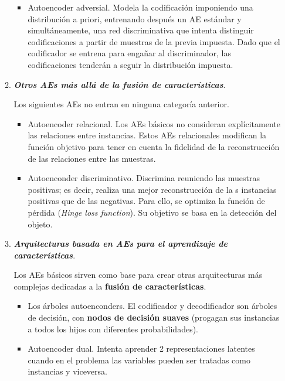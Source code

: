 \begin{enumerate}
\begin{enumerate}
\begin{itemize}
            \item Autoencoder adversial. Modela la codificación imponiendo una distribución a priori, entrenando después un AE estándar y simultáneamente, una red discriminativa que intenta distinguir codificaciones a partir de muestras de la previa impuesta. Dado que el codificador se entrena para engañar al discriminador, las codificaciones tenderán a seguir la distribución impuesta.
        \end{itemize}
        
        \item \textit{\textbf{Otros AEs más allá de la fusión de características}}.
        \par Los siguientes AEs no entran en ninguna categoría anterior.
        
        \begin{itemize}
            \item Autoencoder relacional. Los AEs básicos no consideran explícitamente las relaciones entre instancias. Estos AEs relacionales modifican la función objetivo para tener en cuenta la fidelidad de la reconstrucción de las relaciones entre las muestras.
            \newpage
            
            \item Autoenconder discriminativo. Discrimina reuniendo las muestras positivas; es decir, realiza una mejor reconstrucción de la s instancias positivas que de las negativas. Para ello, se optimiza la función de pérdida (\textit{Hinge loss function}). Su objetivo se basa en la detección del objeto.
            
        \end{itemize} 
        
        \item \textit{\textbf{Arquitecturas basada en AEs para el aprendizaje de características}}.
        \par Los AEs básicos sirven como base para crear otras arquitecturas más complejas dedicadas a la \textbf{fusión de características}.
        
        \begin{itemize}
            \item Los árboles autoenconders. El codificador y decodificador son árboles de decisión, con \textbf{nodos de decisión suaves} (progagan sus instancias a todos los hijos con diferentes probabilidades).
            
            \item Autoencoder dual. Intenta aprender 2 representaciones latentes cuando en el problema las variables pueden ser tratadas como instancias y viceversa.
            

\end{itemize}
\end{enumerate}
\end{enumerate}
